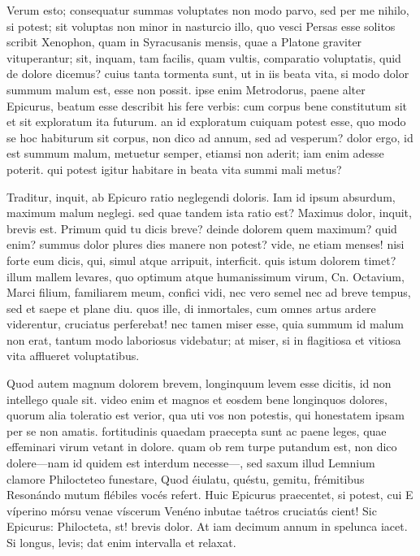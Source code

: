  Verum esto; consequatur summas voluptates non modo parvo, sed per me nihilo, si potest; sit voluptas non minor in nasturcio illo, quo vesci Persas esse solitos scribit Xenophon, quam in Syracusanis mensis, quae a Platone graviter vituperantur; sit, inquam, tam facilis, quam vultis, comparatio voluptatis, quid de dolore dicemus? cuius tanta tormenta sunt, ut in iis beata vita, si modo dolor summum malum est, esse non possit. ipse enim Metrodorus, paene alter Epicurus, beatum esse describit his fere verbis: cum corpus bene constitutum sit et sit exploratum ita futurum. an id exploratum cuiquam potest esse, quo modo se hoc habiturum sit corpus, non dico ad annum, sed ad vesperum? dolor ergo, id est summum malum, metuetur semper, etiamsi non aderit; iam enim adesse poterit. qui potest igitur habitare in beata vita summi mali metus?

 Traditur, inquit, ab Epicuro ratio neglegendi doloris. Iam id ipsum absurdum, maximum malum neglegi. sed quae tandem ista ratio est? Maximus dolor, inquit, brevis est. Primum quid tu dicis breve? deinde dolorem quem maximum? quid enim? summus dolor plures dies manere non potest? vide, ne etiam menses! nisi forte eum dicis, qui, simul atque arripuit, interficit. quis istum dolorem timet? illum mallem levares, quo optimum atque humanissimum virum, Cn. Octavium, Marci filium, familiarem meum, confici vidi, nec vero semel nec ad breve tempus, sed et saepe et plane diu. quos ille, di inmortales, cum omnes artus ardere viderentur, cruciatus perferebat! nec tamen miser esse, quia summum id malum non erat, tantum modo laboriosus videbatur; at miser, si in flagitiosa et vitiosa vita afflueret voluptatibus.

 Quod autem magnum dolorem brevem, longinquum levem esse dicitis, id non intellego quale sit. video enim et magnos et eosdem bene longinquos dolores, quorum alia toleratio est verior, qua uti vos non potestis, qui honestatem ipsam per se non amatis. fortitudinis quaedam praecepta sunt ac paene leges, quae effeminari virum vetant in dolore. quam ob rem turpe putandum est, non dico dolere—nam id quidem est interdum necesse—, sed saxum illud Lemnium clamore Philocteteo funestare, Quod éiulatu, quéstu, gemitu, frémitibus Resonándo mutum flébiles vocés refert. Huic Epicurus praecentet, si potest, cui E víperino mórsu venae víscerum Venéno inbutae taétros cruciatús cient! Sic Epicurus: Philocteta, st! brevis dolor. At iam decimum annum in spelunca iacet. Si longus, levis; dat enim intervalla et relaxat.

